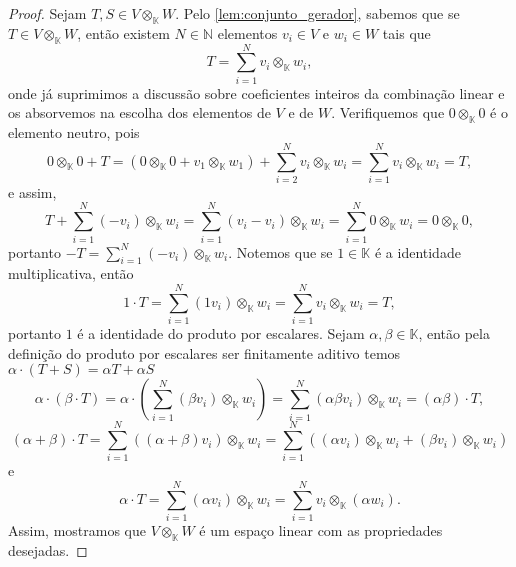 \begin{proof}
    Sejam \(T, S \in V \otimes_{\mathbb{K}}W\). Pelo \cref{lem:conjunto_gerador}, sabemos que se \(T \in V \otimes_{\mathbb{K}} W\), então existem \(N \in \mathbb{N}\) elementos \(v_i \in V\) e \(w_i \in W\) tais que
    \begin{equation*}
        T = \sum_{i = 1}^N v_i \otimes_{\mathbb{K}} w_i,
    \end{equation*}
    onde já suprimimos a discussão sobre coeficientes inteiros da combinação linear e os absorvemos na escolha dos elementos de \(V\) e de \(W\). Verifiquemos que \(0 \otimes_\mathbb{K} 0\) é o elemento neutro, pois
    \begin{equation*}
        0 \otimes_{\mathbb{K}} 0 + T = (0 \otimes_{\mathbb{K}} 0 + v_1 \otimes_{\mathbb{K}} w_1) + \sum_{i = 2}^N v_i \otimes_{\mathbb{K}} w_i = \sum_{i = 1}^N v_i \otimes_{\mathbb{K}} w_i = T,
    \end{equation*}
    e assim,
    \begin{equation*}
        T + \sum_{i =1}^N (-v_i) \otimes_{\mathbb{K}} w_i = \sum_{i = 1}^N (v_i - v_i) \otimes_{\mathbb{K}} w_i = \sum_{i=1}^N 0 \otimes_{\mathbb{K}} w_i = 0\otimes_\mathbb{K} 0,
    \end{equation*}
    portanto \(-T = \sum_{i = 1}^N (-v_i)\otimes_{\mathbb{K}} w_i\).
    Notemos que se \(1 \in \mathbb{K}\) é a identidade multiplicativa, então
    \begin{equation*}
        1 \cdot T = \sum_{i = 1}^N (1 v_i)\otimes_{\mathbb{K}} w_i = \sum_{i = 1}^N v_i \otimes _{\mathbb{K}} w_i = T,
    \end{equation*}
    portanto \(1\) é a identidade do produto por escalares.
    Sejam \(\alpha, \beta \in \mathbb{K}\), então  pela definição do produto por escalares ser finitamente aditivo temos \(\alpha \cdot (T + S) = \alpha T + \alpha S\)
    \begin{equation*}
        \alpha \cdot \left( \beta \cdot T\right) = \alpha \cdot \left( \sum_{i = 1}^N (\beta v_i)\otimes_{\mathbb{K}} w_i \right) = \sum_{i = 1}^N (\alpha \beta v_i) \otimes_{\mathbb{K}} w_i = (\alpha \beta) \cdot T,
    \end{equation*}
    \begin{equation*}
        (\alpha + \beta) \cdot T = \sum_{i = 1}^N ((\alpha + \beta) v_i) \otimes_{\mathbb{K}} w_i = \sum_{i = 1}^N \left((\alpha v_i) \otimes_{\mathbb{K}} w_i + (\beta v_i) \otimes_{\mathbb{K}} w_i\right)
    \end{equation*}
    e
    \begin{equation*}
        \alpha \cdot T = \sum_{i = 1}^N (\alpha v_i) \otimes_{\mathbb{K}} w_i = \sum_{i = 1}^N v_i \otimes_{\mathbb{K}} (\alpha w_i).
    \end{equation*}
    Assim, mostramos que \(V \otimes_{\mathbb{K}} W\) é um espaço linear com as propriedades desejadas.
\end{proof}

